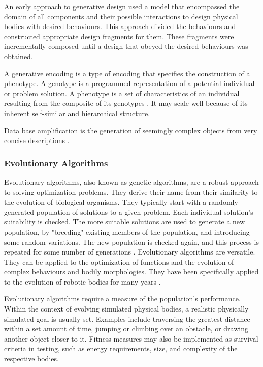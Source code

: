 An early approach to generative design used a model that encompassed the domain of all components and their possible interactions to design physical bodies with desired behaviours. This approach divided the behaviours and constructed appropriate design fragments for them. These fragments were incrementally composed until a design that obeyed the desired behaviours was obtained. \cite{Brose1993} 

A generative encoding is a type of encoding that specifies the construction of a phenotype. A genotype is a programmed representation of a potential individual or problem solution. A phenotype is a set of characteristics of an individual resulting from the composite of its genotypes \cite{Sims1994a}. It may scale well because of its inherent self-similar and hierarchical structure. \cite{Hornby2001b}

Data base amplification is the generation of seemingly complex objects from very concise descriptions \cite{Prusinkiewicz2004}.

\subsubsection{Evolutionary Algorithms}

Evolutionary algorithms, also known as genetic algorithms, are a robust approach to solving optimization problems. They derive their name from their similarity to the evolution of biological organisms. They typically start with a randomly generated population of solutions to a given problem. Each individual solution's suitability is checked. The more suitable solutions are used to generate a new population, by "breeding" existing members of the population, and introducing some random variations. The new population is checked again, and this process is repeated for some number of generations \cite{Groenwold1999}. Evolutionary algorithms are versatile. They can be applied to the optimization of functions and the evolution of complex behaviours and bodily morphologies. They have been specifically applied to the evolution of robotic bodies for many years \cite{Sims1994a,Sims1994b}.

Evolutionary algorithms require a measure of the population's performance. Within the context of evolving simulated physical bodies, a realistic physically simulated goal is usually set. Examples include traversing the greatest distance within a set amount of time, jumping or climbing over an obstacle, or drawing another object closer to it. Fitness measures may also be implemented as survival criteria in testing, such as energy requirements, size, and complexity of the respective bodies. \cite{Sims1994a, Sims1994b}


